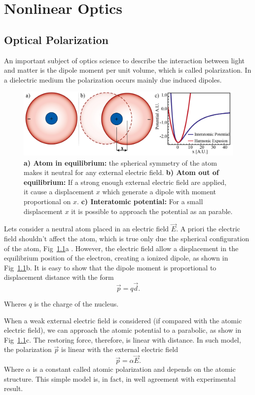 \chapter{Nonlinear Optics}
\section{Optical Polarization}
An important subject of optics science to describe the interaction between light and matter is the dipole moment per unit volume, which is called polarization. In a dielectric medium the polarization occurs mainly due induced dipoles.

\begin{figure}[h!]
    \centering
    \includegraphics[width = 16cm]{figuras/Dissertation_atomic_polarization.jpg}
    \caption{\textbf{a) Atom in equilibrium:} the spherical symmetry of the atom makes it neutral for any external electric field. \textbf{b) Atom out of equilibrium:} If a strong enough external electric field are applied, it cause a displacement $x$ which generate a dipole with moment proportional on $x$. \textbf{c) Interatomic potential:} For a small displacement $x$ it is possible to approach the potential as an parable.}
    \label{fig:polarization}
\end{figure}
Lets consider a neutral atom placed in an electric field $\vec{E}$. A priori the electric field shouldn't affect the atom, which is true only due the spherical configuration of the atom, Fig~\ref{fig:polarization}a
. However, the electric field allow a displacement in the equilibrium position of the electron, creating a ionized dipole, as shown in Fig~\ref{fig:polarization}b. It is easy to show that the dipole moment is proportional to displacement distance with the form
\begin{equation}
    \vec{p} = q\vec{d}.
\end{equation}

Wheres $q$ is the charge of the nucleus. 

When a weak external electric field is considered (if compared with the atomic electric field), we can approach the atomic potential to a parabolic, as show in Fig~\ref{fig:polarization}c. The restoring force, therefore, is linear with distance. In such model, the polarization $\vec{p}$ is linear with the external electric field
\begin{equation}
    \vec{p} = \alpha \vec{E}.
\end{equation}
Where $\alpha$ is a constant called atomic polarization and depends on the atomic structure. This simple model is, in fact, in well agreement with experimental result.  

